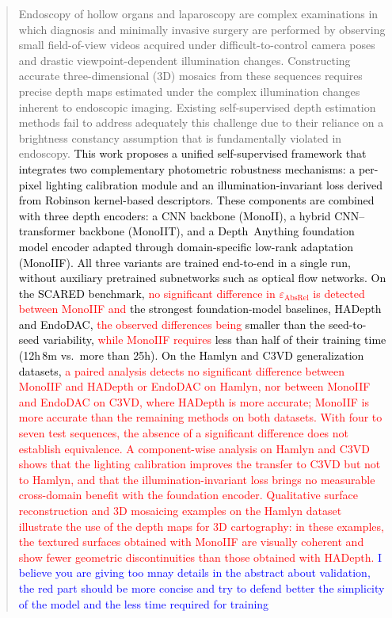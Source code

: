 \documentclass[a4paper,fleqn]{cas-dc}
\begin{document}
\maketitle
\begin{abstract}
%
Endoscopy of hollow organs and laparoscopy are complex examinations 
in which diagnosis and minimally invasive surgery are performed by observing small field-of-view videos acquired under difficult-to-control camera poses and drastic viewpoint-dependent illumination changes.  Constructing accurate three-dimensional (3D) mosaics from these sequences requires precise depth maps estimated under the complex illumination changes inherent to endoscopic imaging.  Existing self-supervised depth estimation methods fail to address adequately this challenge due to their reliance on a brightness constancy assumption that is fundamentally violated in endoscopy. \textcolor{black}{This work proposes a unified self-supervised framework that integrates two complementary photometric robustness mechanisms: a per-pixel lighting calibration module and an illumination-invariant loss derived from Robinson kernel-based descriptors. These components are combined with three depth encoders: a CNN backbone (MonoII), a hybrid CNN--transformer backbone (MonoIIT), and a Depth~Anything foundation model encoder adapted through domain-specific low-rank adaptation (MonoIIF). All three variants are trained end-to-end in a single run, without auxiliary pretrained subnetworks such as optical flow networks. On the SCARED benchmark, \textcolor{red}{no significant difference in $\varepsilon_\textrm{AbsRel}$ is detected between MonoIIF and} the strongest foundation-model baselines, HADepth and EndoDAC, \textcolor{red}{the observed differences being} smaller than the seed-to-seed variability, \textcolor{red}{while MonoIIF requires} less than half of their training time (12h\,8m vs.\ more than 25h). On the Hamlyn and C3VD generalization datasets, \textcolor{red}{a paired analysis detects no significant difference between MonoIIF and HADepth or EndoDAC on Hamlyn, nor between MonoIIF and EndoDAC on C3VD, where HADepth is more accurate; MonoIIF is more accurate than the remaining methods on both datasets. With four to seven test sequences, the absence of a significant difference does not establish equivalence.} \textcolor{red}{A component-wise analysis on Hamlyn and C3VD shows that the lighting calibration improves the transfer to C3VD but not to Hamlyn, and that the illumination-invariant loss brings no measurable cross-domain benefit with the foundation encoder.} \textcolor{red}{Qualitative surface reconstruction and 3D mosaicing examples on the Hamlyn dataset illustrate the use of the depth maps for 3D cartography: in these examples, the textured surfaces obtained with MonoIIF are visually coherent and show fewer geometric discontinuities than those obtained with HADepth.} \textcolor{blue}{I believe you are giving too mnay details in the abstract about validation, the red part should be more concise and try to defend better the simplicity of the model and the less time required for training}}

\end{abstract}
\end{document}
